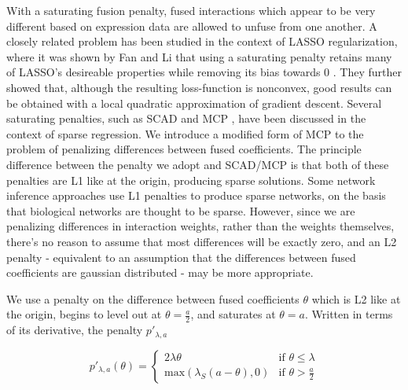 \documentclass[11pt]{article}
\begin{document}
With a saturating fusion penalty, fused interactions which appear to be very different based on expression data are allowed to unfuse from one another. A closely related problem has been studied in the context of LASSO regularization, where it was shown by Fan and Li that using a saturating penalty retains many of LASSO's desireable properties while removing its bias towards 0 \cite{fan2001variable}. They further showed that, although the resulting loss-function is nonconvex, good results can be obtained with a local quadratic approximation of gradient descent. Several saturating penalties, such as SCAD \cite{fan2001variable} and MCP \cite{zhang2010nearly}, have been discussed in the context of sparse regression. We introduce a modified form of MCP to the problem of penalizing differences between fused coefficients. The principle difference between the penalty we adopt and SCAD/MCP is that both of these penalties are L1 like at the origin, producing sparse solutions. Some network inference approaches use L1 penalties to produce sparse networks, on the basis that biological networks are thought to be sparse. However, since we are penalizing differences in interaction weights, rather than the weights themselves, there's no reason to assume that most differences will be exactly zero, and an L2 penalty - equivalent to an assumption that the differences between fused coefficients are gaussian distributed - may be more appropriate.

We use a penalty on the difference between fused coefficients $\theta$ which is L2 like at the origin, begins to level out at $\theta = \frac{a}{2}$, and saturates at $\theta = a$. Written in terms of its derivative, the penalty $p'_{\lambda, a}$

\begin{equation}
p'_{\lambda,a}(\theta) = \left\{
    \begin{array}{lr}
    2\lambda\theta & \text{if } \theta \leq \lambda\\
    \text{max}(\lambda_S(a-\theta),0) & \text{if } \theta > \frac{a}{2}
    \end{array}
    \right.
\end{equation}


\end{document}
